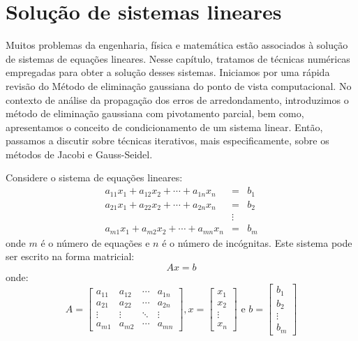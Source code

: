 
%


\chapter{Solução de sistemas lineares}

Muitos problemas da engenharia, física e matemática estão associados à solução de sistemas de equações lineares. Nesse capítulo, tratamos de técnicas numéricas empregadas para obter a solução desses sistemas. Iniciamos por uma rápida revisão do Método de eliminação gaussiana do ponto de vista computacional. No contexto de análise da propagação dos erros de arredondamento, introduzimos o método de eliminação gaussiana com pivotamento parcial, bem como, apresentamos o conceito de condicionamento de um sistema linear. Então, passamos a discutir sobre técnicas iterativos, mais especificamente, sobre os métodos de Jacobi e Gauss-Seidel.


Considere o sistema de equações lineares:
\begin{eqnarray*}
a_{11}x_1 + a_{12}x_2 + \cdots +a_{1n}x_n &=& b_1\\
a_{21}x_1 + a_{22}x_2 + \cdots +a_{2n}x_n &=& b_2\\
                                      &\vdots& \\
a_{m1}x_1 + a_{m2}x_2 + \cdots +a_{mn}x_n &=& b_m
\end{eqnarray*}
onde $m$ é o número de equações e $n$ é o número de incógnitas.  Este sistema pode ser escrito na forma matricial:
\begin{equation*}
  Ax = b
\end{equation*}
onde:
\begin{equation*}
  A=\begin{bmatrix}
a_{11} & a_{12} & \cdots & a_{1n}\\
a_{21} & a_{22} & \cdots & a_{2n}\\
\vdots & \vdots & \ddots & \vdots\\
a_{m1} & a_{m2} & \cdots & a_{mn}
\end{bmatrix},
x=\begin{bmatrix}
x_{1} \\
x_{2} \\
\vdots \\
x_{n}
\end{bmatrix}
 \text{ e } b=\begin{bmatrix}
b_{1} \\
b_{2} \\
\vdots \\
b_{m}
\end{bmatrix}
\end{equation*}

